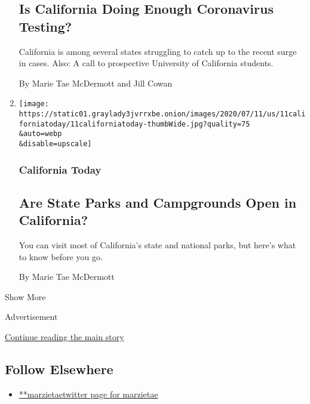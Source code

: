 \begin{enumerate}
{  \subsection{Is California Doing Enough Coronavirus
  Testing?}\label{is-california-doing-enough-coronavirus-testing}}

  California is among several states struggling to catch up to the
  recent surge in cases. Also: A call to prospective University of
  California students.

  By Marie Tae McDermott and Jill Cowan
\item
  \href{/2020/07/13/us/california-parks-coronavirus.html}{}

  \texttt{[image: https://static01.graylady3jvrrxbe.onion/images/2020/07/11/us/11californiatoday/11californiatoday-thumbWide.jpg?quality=75\\\&auto=webp\\\&disable=upscale]}

  \hypertarget{california-today-8}{%
  \subsubsection{California Today}\label{california-today-8}}

  \hypertarget{are-state-parks-and-campgrounds-open-in-california}{%
  \subsection{Are State Parks and Campgrounds Open in
  California?}\label{are-state-parks-and-campgrounds-open-in-california}}

  You can visit most of California's state and national parks, but
  here's what to know before you go.

  By Marie Tae McDermott
\end{enumerate}

Show More

Advertisement

\protect\hyperlink{after-mid2}{Continue reading the main story}

\hypertarget{follow-elsewhere}{%
\subsection{Follow Elsewhere}\label{follow-elsewhere}}

\begin{itemize}
\tightlist
\item
  \href{https://twitter.com/marzietae}{**marzietaetwitter page for
  marzietae}
\end{itemize}

